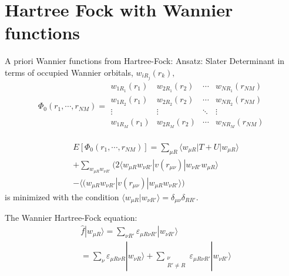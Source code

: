 \documentclass[12pt,a4paper,english]{beamer}
\newcommand{\ket}[1]{|#1\rangle}
\newcommand{\braket}[2]{\langle #1|#2\rangle}
\newcommand{\braopket}[3]{\langle #1|#2|#3\rangle}
\begin{document}
\section{Hartree Fock with Wannier functions}
\begin{frame}
A priori Wannier functions from Hartree-Fock:
Ansatz: Slater Determinant in terms of occupied Wannier orbitals, 
$w_{iR_j}(r_k),$
\[\Phi_0(r_{1},\cdots,r_{NM})=
  \begin{array}{|cccc|}
	w_{1R_1}(r_1) & w_{2R_1}(r_2) & \cdots & w_{NR_1}(r_{NM})\\
	w_{1R_2}(r_1) & w_{2R_2}(r_2)&\cdots&w_{NR_2}(r_{NM})\\
	\vdots & \vdots & \ddots & \vdots\\
	w_{1R_M}(r_{1}) & w_{2R_M}(r_{2}) & \cdots & w_{NR_M}(r_{NM})\\
  \end{array}
\]
\end{frame}



\begin{frame}
   \begin{equation*}
	\begin{split}
	  &E[\Phi_0(r_{1},\cdots,r_{NM})]=
	  \sum_{\mu R} \braopket{w_{\mu R}}{T+U}{w_{\mu R}}\\
	  &+\sum_{w_{\mu R}w_{\nu R'}}\Big(2\braopket{w_{\mu R}w_{\nu R'}}{v(r_{\mu\nu})}{w_{\nu R'}w_{\mu R}}\\
	  &-\braopket{(w_{\mu R}w_{\nu R'}}{v(r_{\mu\nu})}{w_{\mu R}w_{\nu R'}}\Big)
	\end{split}
  \end{equation*}
  is minimized with the condition $\braket{w_{\mu R}}{w_{\nu {R'}}}=\delta_{\mu\nu}\delta_{R R'}.$
 
\end{frame}

\begin{frame}
    The Wannier Hartree-Fock equation:
  \begin{equation*}
	\begin{split}
			&\hat{f}\ket{w_{\mu R}}=\sum_{\nu R'}\varepsilon_{\mu R\nu R'}\ket{w_{\nu R'}}\\
			&=\sum_{\nu}\varepsilon_{\mu R \nu R}\ket{w_{\nu R}}+\sum_{\substack{\nu \\R'\neq R}}\varepsilon_{\mu R \nu R'}\ket{w_{\nu R'}}
	\end{split}
  \end{equation*}
\end{frame}
\end{document}
